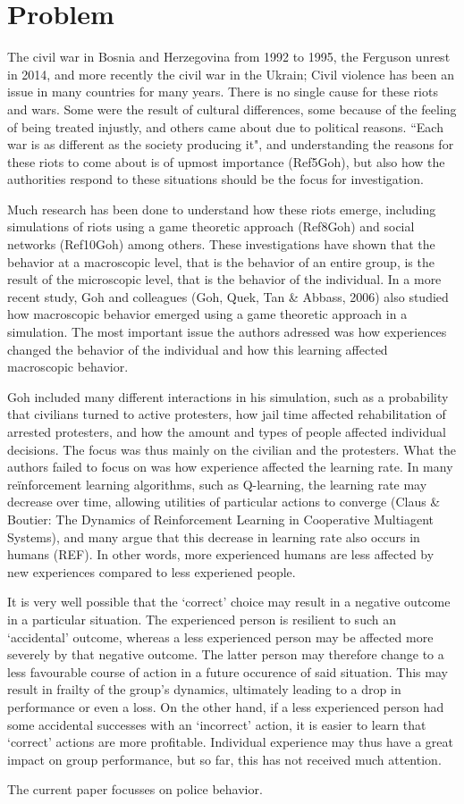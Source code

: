 \chapter{Problem}
The civil war in Bosnia and Herzegovina from 1992 to 1995, the Ferguson unrest in 2014, and more recently the civil war in the Ukrain; Civil violence has been an issue in many countries for many years. There is no single cause for these riots and wars. Some were the result of cultural differences, some because of the feeling of being treated injustly, and others came about due to political reasons. ``Each war is as different as the society producing it", and understanding the reasons for these riots to come about is of upmost importance (Ref5Goh), but also how the authorities respond to these situations should be the focus for investigation. 

Much research has been done to understand how these riots emerge, including simulations of riots using a game theoretic approach (Ref8Goh) and social networks (Ref10Goh) among others. These investigations have shown that the behavior at a macroscopic level, that is the behavior of an entire group, is the result of the microscopic level, that is the behavior of the individual. In a more recent study, Goh and colleagues (Goh, Quek, Tan \& Abbass, 2006) also studied how macroscopic behavior emerged using a game theoretic approach in a simulation. The most important issue the authors adressed was how experiences changed the behavior of the individual and how this learning affected macroscopic behavior. 

Goh included many different interactions in his simulation, such as a probability that civilians turned to active protesters, how jail time affected rehabilitation of arrested protesters, and how the amount and types of people affected individual decisions. The focus was thus mainly on the civilian and the protesters. What the authors failed to focus on was how experience affected the learning rate. In many re\"inforcement learning algorithms, such as Q-learning, the learning rate may decrease over time, allowing utilities of particular actions to converge (Claus \& Boutier: The Dynamics of Reinforcement Learning in Cooperative Multiagent Systems), and many argue that this decrease in learning rate also occurs in humans (REF). In other words, more experienced humans are less affected by new experiences compared to less experiened people. 

It is very well possible that the `correct' choice may result in a negative outcome in a particular situation. The experienced person is resilient to such an `accidental' outcome, whereas a less experienced person may be affected more severely by that negative outcome. The latter person may therefore change to a less favourable course of action in a future occurence of said situation. This may result in frailty of the group's dynamics, ultimately leading to a drop in performance or even a loss. On the other hand, if a less experienced person had some accidental successes with an `incorrect' action, it is easier to learn that `correct' actions are more profitable. Individual experience may thus have a great impact on group performance, but so far, this has not received much attention. 

The current paper focusses on police behavior. 
